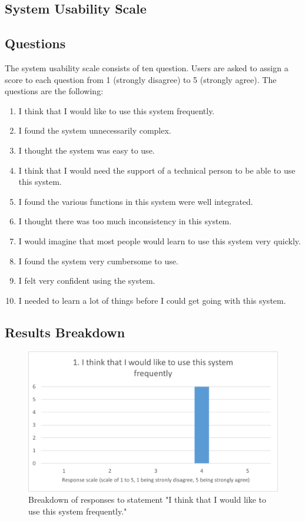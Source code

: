 \documentclass{l4proj}
\begin{document}
\begin{appendices}
\chapter{System Usability Scale}
\label{Ap:SUS}

\section{Questions}

The system usability scale consists of ten question. Users are asked to assign a score to each question from 1 (strongly disagree) to 5 (strongly agree). The questions are the following: 
\begin{enumerate}
                \item I think that I would like to use this system frequently.
                \item I found the system unnecessarily complex.
                \item I thought the system was easy to use.
                \item I think that I would need the support of a technical person to be able to use this system.
                \item I found the various functions in this system were well integrated.
                \item I thought there was too much inconsistency in this system.
                \item I would imagine that most people would learn to use this system very quickly.
                \item I found the system very cumbersome to use.
                \item I felt very confident using the system.
                \item I needed to learn a lot of things before I could get going with this system.	
\end{enumerate}

\section{Results Breakdown}
\label{Ap:Results}

\begin{figure}[h]
    \centering
    \includegraphics[width=0.7\linewidth]{images/upload/sus_results/q1.png}
    \caption{Breakdown of responses to statement "I think that I would like to use this system frequently."}
    \label{fig:q1}
\end{figure}


\end{appendices}
\end{document}
